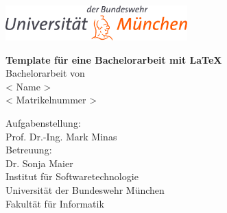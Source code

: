 \thispagestyle{empty}
\vspace*{-2ex}

\centerline{\includegraphics[width=7cm]{pics/athene.png}}
\vspace{4cm}

\begin{center}

\begin{minipage}[t]{10cm}     
\begin{center}
{\bf  Template f\"ur eine Bachelorarbeit mit \LaTeX }\\[5mm]
Bachelorarbeit von \\
< Name >\\
< Matrikelnummer >\\[5mm]
\end{center}
\end{minipage}               

\vspace*{4cm}
Aufgabenstellung:\\
Prof. Dr.-Ing. Mark Minas\\[1cm]
Betreuung:\\
Dr. Sonja Maier \\[3cm]

Institut f\"ur Softwaretechnologie\\
Universit\"at der Bundeswehr M\"unchen\\
Fakult\"at f\"ur Informatik\\

\end{center}

